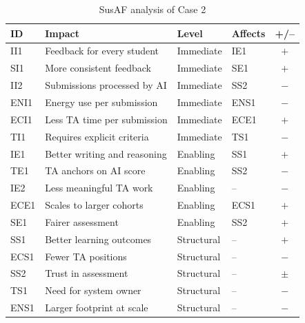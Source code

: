 \begin{table}[H]
    \centering
    \small
    \begin{tabularx}{\textwidth}{|l|X|l|l|c|}
        \hline
        \textbf{ID} & \textbf{Impact} & \textbf{Level} & \textbf{Affects} & \textbf{+/--} \\ \hline
        II1 & Feedback for every student & Immediate & IE1 & $+$ \\ \hline
        SI1 & More consistent feedback & Immediate & SE1 & $+$ \\ \hline
        II2 & Submissions processed by AI & Immediate & SS2 & $-$ \\ \hline
        ENI1 & Energy use per submission & Immediate & ENS1 & $-$ \\ \hline
        ECI1 & Less TA time per submission & Immediate & ECE1 & $+$ \\ \hline
        TI1 & Requires explicit criteria & Immediate & TS1 & $-$ \\ \hline
        IE1 & Better writing and reasoning & Enabling & SS1 & $+$ \\ \hline
        TE1 & TA anchors on AI score & Enabling & SS2 & $-$ \\ \hline
        IE2 & Less meaningful TA work & Enabling & -- & $-$ \\ \hline
        ECE1 & Scales to larger cohorts & Enabling & ECS1 & $+$ \\ \hline
        SE1 & Fairer assessment & Enabling & SS2 & $+$ \\ \hline
        SS1 & Better learning outcomes & Structural & -- & $+$ \\ \hline
        ECS1 & Fewer TA positions & Structural & -- & $-$ \\ \hline
        SS2 & Trust in assessment & Structural & -- & $\pm$ \\ \hline
        TS1 & Need for system owner & Structural & -- & $-$ \\ \hline
        ENS1 & Larger footprint at scale & Structural & -- & $-$ \\ \hline
    \end{tabularx}
    \caption{SusAF analysis of Case 2}
    \label{tab:susaf-case2}
\end{table}


